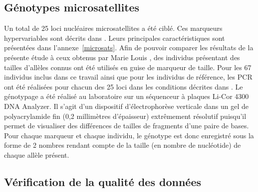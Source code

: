 \documentclass[a4paper,12pt,twoside]{article}\usepackage[]{graphicx}\usepackage[]{color}
\begin{document}
\begin {bibunit} [newbst]
\subsection{Génotypes microsatellites}
Un total de 25 loci nucléaires microsatellites a été ciblé. Ces marqueurs hypervariables sont décrits dans \citet{louis2014}. Leurs principales caractéristiques sont présentées dans l'annexe~\ref{microsats}. Afin de pouvoir comparer les résultats de la présente étude à ceux obtenus par Marie Louis \citep{louis2014}, des individus présentant des tailles d'allèles connus ont été utilisés en guise de marqueur de taille. Pour les 67 individus inclus dans ce travail ainsi que pour les individus de référence, les PCR ont été réalisées pour chacun des 25 loci dans les conditions décrites dans \citet{louis2014}. Le génotypage a été réalisé au laboratoire sur un séquenceur à plaques Li-Cor 4300 DNA Analyzer. Il s'agit d'un dispositif d'électrophorèse verticale dans un gel de polyacrylamide fin (0,2 millimètres d'épaisseur) extrêmement résolutif puisqu'il permet de visualiser des différences de tailles de fragments d'une paire de bases. Pour chaque marqueur et chaque individu, le génotype est donc enregistré sous la forme de 2 nombres rendant compte de la taille (en nombre de nucléotide) de chaque allèle présent.


\subsection{Vérification de la qualité des données}


\end{bibunit}
\end{document}
